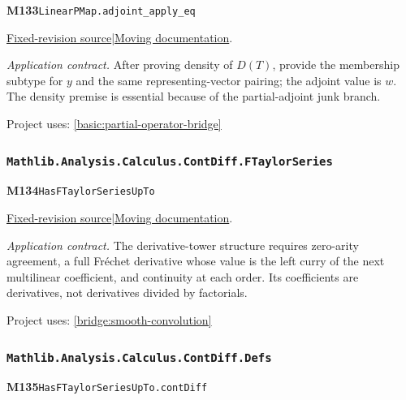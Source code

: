 \documentclass[11pt,a4paper]{article}
\theoremstyle{definition}
\theoremstyle{remark}
\begin{document}
\noindent\textbf{M133}\label{base:M133}\quad\nolinkurl{LinearPMap.adjoint_apply_eq}

\href{https://github.com/leanprover-community/mathlib4/blob/9bac2d0692944a775113f7c130fd5e5b4608a854/Mathlib/Analysis/InnerProductSpace/LinearPMap.lean}{Fixed-revision source}\quad|\quad\href{https://leanprover-community.github.io/mathlib4_docs/Mathlib/Analysis/InnerProductSpace/LinearPMap.html#LinearPMap.adjoint_apply_eq}{Moving documentation}.\par
\noindent\textit{Application contract.} After proving density of $D(T)$, provide the membership subtype for $y$ and the same representing-vector pairing; the adjoint value is $w$. The density premise is essential because of the partial-adjoint junk branch.\par
{\small Project uses: \ref{basic:partial-operator-bridge}}\par\medskip

\subsubsection*{\nolinkurl{Mathlib.Analysis.Calculus.ContDiff.FTaylorSeries}}
\noindent\textbf{M134}\label{base:M134}\quad\nolinkurl{HasFTaylorSeriesUpTo}

\href{https://github.com/leanprover-community/mathlib4/blob/9bac2d0692944a775113f7c130fd5e5b4608a854/Mathlib/Analysis/Calculus/ContDiff/FTaylorSeries.lean}{Fixed-revision source}\quad|\quad\href{https://leanprover-community.github.io/mathlib4_docs/Mathlib/Analysis/Calculus/ContDiff/FTaylorSeries.html#HasFTaylorSeriesUpTo}{Moving documentation}.\par
\noindent\textit{Application contract.} The derivative-tower structure requires zero-arity agreement, a full Fr\'echet derivative whose value is the left curry of the next multilinear coefficient, and continuity at each order. Its coefficients are derivatives, not derivatives divided by factorials.\par
{\small Project uses: \ref{bridge:smooth-convolution}}\par\medskip

\subsubsection*{\nolinkurl{Mathlib.Analysis.Calculus.ContDiff.Defs}}
\noindent\textbf{M135}\label{base:M135}\quad\nolinkurl{HasFTaylorSeriesUpTo.contDiff}
\end{document}
